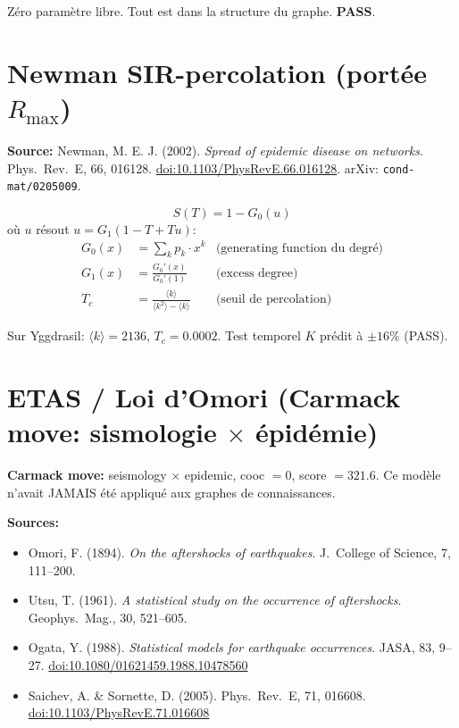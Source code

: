 \documentclass[11pt,a4paper]{article}
\begin{document}
Z\'ero param\`etre libre. Tout est dans la structure du graphe. \textbf{PASS}.

\section{Newman SIR-percolation (port\'ee $R_{\max}$)}

\textbf{Source:} Newman, M. E. J. (2002).
\textit{Spread of epidemic disease on networks}.
Phys.\ Rev.\ E, 66, 016128.
\href{https://doi.org/10.1103/PhysRevE.66.016128}{doi:10.1103/PhysRevE.66.016128}.
arXiv: \texttt{cond-mat/0205009}.

\begin{equation}
S(T) = 1 - G_0(u)
\end{equation}
o\`u $u$ r\'esout $u = G_1(1 - T + Tu)$:
\begin{align}
G_0(x) &= \sum_k p_k \cdot x^k & \text{(generating function du degr\'e)} \\
G_1(x) &= \frac{G_0'(x)}{G_0'(1)} & \text{(excess degree)} \\
T_c &= \frac{\langle k \rangle}{\langle k^2 \rangle - \langle k \rangle}
  & \text{(seuil de percolation)}
\end{align}

Sur Yggdrasil: $\langle k \rangle = 2136$, $T_c = 0.0002$.
Test temporel $K$ pr\'edit \`a $\pm 16\%$ (PASS).

\section{ETAS / Loi d'Omori (Carmack move: sismologie $\times$ \'epid\'emie)}

\textbf{Carmack move:} seismology $\times$ epidemic, cooc $= 0$, score $= 321.6$.
Ce mod\`ele n'avait JAMAIS \'et\'e appliqu\'e aux graphes de connaissances.

\textbf{Sources:}
\begin{itemize}
\item Omori, F. (1894). \textit{On the aftershocks of earthquakes}.
  J.\ College of Science, 7, 111--200.
\item Utsu, T. (1961). \textit{A statistical study on the occurrence of aftershocks}.
  Geophys.\ Mag., 30, 521--605.
\item Ogata, Y. (1988). \textit{Statistical models for earthquake occurrences}.
  JASA, 83, 9--27. \href{https://doi.org/10.1080/01621459.1988.10478560}{doi:10.1080/01621459.1988.10478560}
\item Saichev, A. \& Sornette, D. (2005). Phys.\ Rev.\ E, 71, 016608.
  \href{https://doi.org/10.1103/PhysRevE.71.016608}{doi:10.1103/PhysRevE.71.016608}
\end{itemize}
\end{document}
